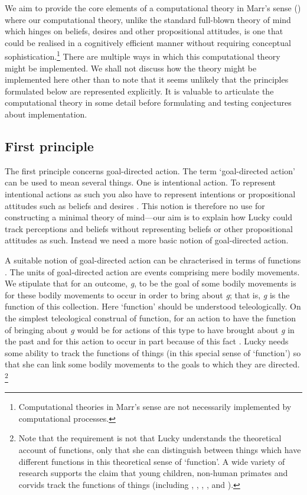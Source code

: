 \documentclass[12pt,\papersize]{extarticle}
\begin{document}
	We aim to provide the core elements of a computational theory in Marr’s sense (\citeyear[][pp.\ 15-29]{en_917}) where our computational theory, unlike the standard full-blown theory of mind which hinges on beliefs, desires and other propositional attitudes, is one that could be realised in a cognitively efficient manner without requiring conceptual sophistication.\footnote{ 	Computational theories in Marr’s sense are not necessarily  implemented by computational processes.}  There are multiple ways in which this computational theory might be implemented.  We shall not discuss how the theory might be implemented here other than to note that it seems unlikely that the principles formulated below are represented explicitly.  It is valuable to articulate the computational theory in some detail before formulating and testing conjectures about implementation.  



\subsection{First principle}

The first principle concerns goal-directed action.
The term ‘goal-directed action’ can be used to mean several things.  One is intentional action.  To represent intentional actions as such you also have to represent intentions or  propositional attitudes such as beliefs and desires \citep[]{en_18}. 
This notion is therefore no use for constructing a minimal theory of mind---our aim is to explain how Lucky could  track perceptions and beliefs without representing beliefs or other propositional attitudes as such.
Instead we need a more basic notion of goal-directed action.  

A suitable notion of goal-directed action can be chracterised in terms of functions \citep{Taylor:1964tr,Dretske:1988sq}.
The units of goal-directed action are events comprising mere bodily movements.  
We stipulate that for an outcome, \textit{g}, to be the goal of some bodily movements is for these bodily movements to occur in order to bring about \textit{g}; that is, \textit{g} is the function of this collection.  Here ‘function’ should be understood teleologically.  On the simplest teleological construal of function, for an action to have the function of bringing about \textit{g} would be for actions of this type to have brought about \textit{g} in the past and for this action to occur in part because of this fact \citep[see further][]{en_144, en_141, en_162, en_139, en_161}.  Lucky needs some ability to track the functions of things (in this special sense of ‘function’) so that she can link some bodily movements to the goals to which they are directed.%
\footnote{
Note that the requirement is not that Lucky understands the theoretical account of functions, only that she can distinguish between things which have different functions in this theoretical sense of ‘function’.  A wide variety of research supports the claim that young children, non-human primates and corvids track the functions of things (including 
	\citealp{en_1086},
	\citealp{en_1318},
	\citealp{en_1431},
	\citealp{en_1447},
	\citealp{en_1325} and
	\citealp{en_1708}%
).
}
\end{document}

